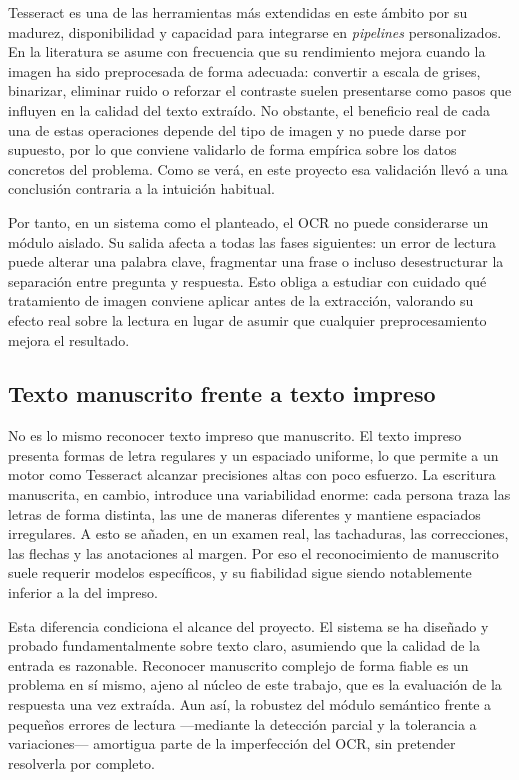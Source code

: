 Tesseract \parencite{smith2007} es una de las herramientas más extendidas en este ámbito por su madurez, disponibilidad y capacidad para integrarse en \emph{pipelines} personalizados. En la literatura se asume con frecuencia que su rendimiento mejora cuando la imagen ha sido preprocesada de forma adecuada: convertir a escala de grises, binarizar, eliminar ruido o reforzar el contraste suelen presentarse como pasos que influyen en la calidad del texto extraído. No obstante, el beneficio real de cada una de estas operaciones depende del tipo de imagen y no puede darse por supuesto, por lo que conviene validarlo de forma empírica sobre los datos concretos del problema. Como se verá, en este proyecto esa validación llevó a una conclusión contraria a la intuición habitual.

Por tanto, en un sistema como el planteado, el OCR no puede considerarse un módulo aislado. Su salida afecta a todas las fases siguientes: un error de lectura puede alterar una palabra clave, fragmentar una frase o incluso desestructurar la separación entre pregunta y respuesta. Esto obliga a estudiar con cuidado qué tratamiento de imagen conviene aplicar antes de la extracción, valorando su efecto real sobre la lectura en lugar de asumir que cualquier preprocesamiento mejora el resultado.

\subsection{Texto manuscrito frente a texto impreso}

No es lo mismo reconocer texto impreso que manuscrito. El texto impreso presenta formas de letra regulares y un espaciado uniforme, lo que permite a un motor como Tesseract alcanzar precisiones altas con poco esfuerzo. La escritura manuscrita, en cambio, introduce una variabilidad enorme: cada persona traza las letras de forma distinta, las une de maneras diferentes y mantiene espaciados irregulares. A esto se añaden, en un examen real, las tachaduras, las correcciones, las flechas y las anotaciones al margen. Por eso el reconocimiento de manuscrito suele requerir modelos específicos, y su fiabilidad sigue siendo notablemente inferior a la del impreso.

Esta diferencia condiciona el alcance del proyecto. El sistema se ha diseñado y probado fundamentalmente sobre texto claro, asumiendo que la calidad de la entrada es razonable. Reconocer manuscrito complejo de forma fiable es un problema en sí mismo, ajeno al núcleo de este trabajo, que es la evaluación de la respuesta una vez extraída. Aun así, la robustez del módulo semántico frente a pequeños errores de lectura —mediante la detección parcial y la tolerancia a variaciones— amortigua parte de la imperfección del OCR, sin pretender resolverla por completo.

